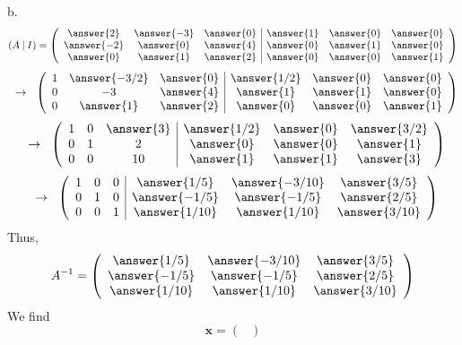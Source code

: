 \documentclass{ximera}
\begin{document}
\begin{exercise}
\begin{prompt}
b.
\[ (A \hspace{.08cm} | \hspace{.08cm} I) = \left(\begin{array}{ccc|ccc}
  \answer{2} & \answer{-3} & \answer{0} &  \answer{1} & \answer{0} & \answer{0}  \\
  \answer{-2} & \answer{0} & \answer{4} & \answer{0} & \answer{1} & \answer{0}\\
  \answer{0} & \answer{1} & \answer{2} &\answer{0} & \answer{0} & \answer{1}
\end{array}\right)
\]
\[
\hspace{.2cm} \rightarrow \hspace{.2cm}
\left(\begin{array}{ccc|ccc}
  1 & \answer{-3/2} & \answer{0} &  \answer{1/2} & \answer{0} & \answer{0}  \\
  0 & -3 & \answer{4} & \answer{1} & \answer{1} & \answer{0}\\
  0 & \answer{1} & \answer{2} &\answer{0} & \answer{0} & \answer{1}
\end{array}\right)
\]
\[
\hspace{.2cm} \rightarrow \hspace{.2cm}
\left(\begin{array}{ccc|ccc}
  1 & 0 & \answer{3} &  \answer{1/2} & \answer{0} & \answer{3/2}  \\
  0 & 1 & 2 & \answer{0} & \answer{0} & \answer{1}\\
  0 & 0 & 10 &\answer{1} & \answer{1} & \answer{3}
\end{array}\right)
\]
\[
\hspace{.2cm} \rightarrow \hspace{.2cm}
\left(\begin{array}{ccc|ccc}
  1 & 0 & 0 &  \answer{1/5} & \answer{-3/10} & \answer{3/5}  \\
  0 & 1 & 0 & \answer{-1/5} & \answer{-1/5} & \answer{2/5}\\
  0 & 0 &1 &\answer{1/10} & \answer{1/10} & \answer{3/10}
\end{array}\right)
\]
Thus,
\[
A^{-1} = \left(\begin{array}{ccc}
  \answer{1/5} & \answer{-3/10} & \answer{3/5}  \\
  \answer{-1/5} & \answer{-1/5} & \answer{2/5}  \\
  \answer{1/10} & \answer{1/10} & \answer{3/10}
\end{array}\right)
\]
We find
\[\textbf{x} = \begin{pmatrix}

\end{pmatrix}\]
\end{prompt}
\end{exercise}
\end{document}
